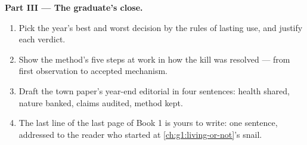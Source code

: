 \begin{problem}
\medskip\noindent\textbf{Part III --- The graduate's
close.}
\begin{enumerate}[resume]
  \item Pick the year's best and worst decision by the
        rules of lasting use, and justify each verdict.
  \item Show the method's five steps at work in how
        the  kill was resolved --- from first
        observation to accepted mechanism.
  \item Draft the town paper's year-end editorial in
        four sentences: health shared, nature banked,
        claims audited, method kept.
  \item The last line of the last page of Book 1 is
        yours to write: one sentence, addressed to the
        reader who started at
        \cref{ch:g1:living-or-not}'s snail.
\end{enumerate}
\end{problem}
